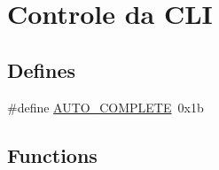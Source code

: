 \hypertarget{group__CLI}{
\section{Controle da CLI}
\label{group__CLI}
}
\subsection*{Defines}
\begin{DoxyCompactItemize}
\item 
\#define \hyperlink{group__CLI_ga174d68ea31b56b93d67f549520156b82}{AUTO\_\-COMPLETE}~0x1b
\end{DoxyCompactItemize}
\subsection*{Functions}
